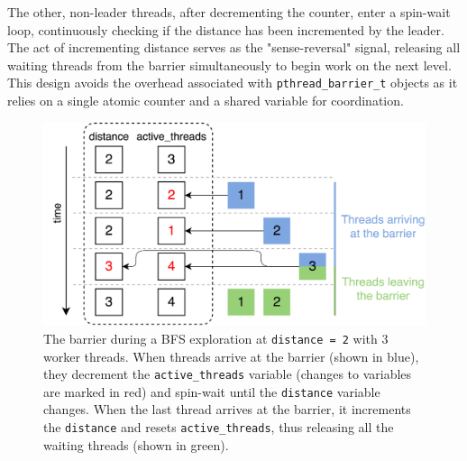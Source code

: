 The other, non-leader threads, after decrementing the counter, enter a spin-wait loop, continuously checking if the distance has been incremented by the leader. The act of incrementing distance serves as the "sense-reversal" signal, releasing all waiting threads from the barrier simultaneously to begin work on the next level. This design avoids the overhead associated with \texttt{pthread\_barrier\_t} objects as it relies on a single atomic counter and a shared variable for coordination.

\begin{figure}[H]
    \centering
    \includegraphics[width=0.6\linewidth]{images/barrier.png}
    \caption{The barrier during a BFS exploration at \texttt{distance = 2} with 3 worker threads. When threads arrive at the barrier (shown in blue), they decrement the \texttt{active\_threads} variable (changes to variables are marked in red) and spin-wait until the \texttt{distance} variable changes. When the last thread arrives at the barrier, it increments the \texttt{distance} and resets \texttt{active\_threads}, thus releasing all the waiting threads (shown in green).}
    \label{fig:barrier}
\end{figure}
\null
\vfill
